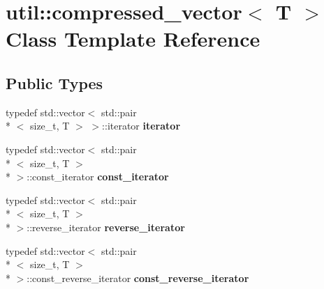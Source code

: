 \hypertarget{classutil_1_1compressed__vector}{\section{util\+:\+:compressed\+\_\+vector$<$ T $>$ Class Template Reference}
\label{classutil_1_1compressed__vector}
}
\subsection*{Public Types}
\begin{DoxyCompactItemize}
\item 
\hypertarget{classutil_1_1compressed__vector_ab206d5331ae4e6639ab6ed98bd170e81}{typedef std\+::vector$<$ std\+::pair\\*
$<$ size\+\_\+t, T $>$ $>$\+::iterator {\bfseries iterator}}\label{classutil_1_1compressed__vector_ab206d5331ae4e6639ab6ed98bd170e81}

\item 
\hypertarget{classutil_1_1compressed__vector_aad1849e24a94a8d377b238a44283d340}{typedef std\+::vector$<$ std\+::pair\\*
$<$ size\+\_\+t, T $>$\\*
 $>$\+::const\+\_\+iterator {\bfseries const\+\_\+iterator}}\label{classutil_1_1compressed__vector_aad1849e24a94a8d377b238a44283d340}

\item 
\hypertarget{classutil_1_1compressed__vector_ade8f753ef32ae793647d62774c7e918f}{typedef std\+::vector$<$ std\+::pair\\*
$<$ size\+\_\+t, T $>$\\*
 $>$\+::reverse\+\_\+iterator {\bfseries reverse\+\_\+iterator}}\label{classutil_1_1compressed__vector_ade8f753ef32ae793647d62774c7e918f}

\item 
\hypertarget{classutil_1_1compressed__vector_a658e29bf2db725bb200a45e9216171a6}{typedef std\+::vector$<$ std\+::pair\\*
$<$ size\+\_\+t, T $>$\\*
 $>$\+::const\+\_\+reverse\+\_\+iterator {\bfseries const\+\_\+reverse\+\_\+iterator}}\label{classutil_1_1compressed__vector_a658e29bf2db725bb200a45e9216171a6}

\end{DoxyCompactItemize}
